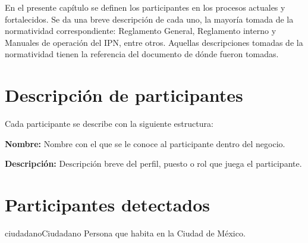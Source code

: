 \label{chapter:ActoresDelSistema}

	En el presente capítulo se definen los participantes en los procesos actuales y fortalecidos. Se da una breve descripción de cada uno, la mayoría tomada de la normatividad correspondiente: Reglamento General, Reglamento interno y Manuales de operación del IPN, entre otros. Aquellas descripciones tomadas de la normatividad tienen la referencia del documento de dónde fueron tomadas.

\section{Descripción de participantes}

Cada participante se describe con la siguiente estructura:

\begin{objetivos}
	\item {\bf Nombre:} Nombre con el que se le conoce al participante dentro del negocio.
	\item {\bf Descripción:} Descripción breve del perfil, puesto o rol que juega el participante.
\end{objetivos}

\section{Participantes detectados}

\begin{actor}{ciudadano}{Ciudadano}{
		Persona que habita en la Ciudad de México.
}	
\end{actor}


